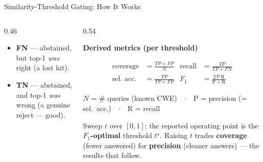 \documentclass[aspectratio=169,10pt]{beamer}
\begin{document}
\begin{frame}{Similarity-Threshold Gating: How It Works}
\begin{columns}[T]
\begin{column}{0.46\textwidth}
      \vspace{0.6em}
      {\scriptsize
      \begin{itemize}\itemsep3pt
        \item \textbf{FN} --- abstained, but top-1 \emph{was} right \textcolor{warn!80!black}{(a lost hit)}.
        \item \textbf{TN} --- abstained, and top-1 \emph{was} wrong \textcolor{hit!70!black}{(a genuine reject --- good)}.
      \end{itemize}}
    \end{column}
    \begin{column}{0.54\textwidth}
      \begin{center}
        {\scriptsize\textbf{Derived metrics (per threshold)}}
      \end{center}
      \vspace{0.1em}
      {\footnotesize
      \[
      \begin{aligned}
        \text{coverage}   &= \frac{TP+FP}{N}   &  \text{recall} &= \frac{TP}{TP+FN}\\[4pt]
        \text{sel.\ acc.} &= \frac{TP}{TP+FP}   &  F_1 &= \frac{2\,\mathrm{P}\,\mathrm{R}}{\mathrm{P}+\mathrm{R}}
      \end{aligned}
      \]}
      \begin{center}
        {\tiny\textcolor{notecol}{$N$ = \# queries (known CWE)\ \ $\cdot$\ \ P = precision (= sel.\ acc.)\ \ $\cdot$\ \ R = recall}}
      \end{center}

      \vspace{0.3em}
      \begin{tcolorbox}[colback=c1!4, colframe=c1!60!black, boxrule=0.35pt,
        left=3pt, right=3pt, top=2pt, bottom=2pt, arc=2pt, width=\linewidth]
        \scriptsize
        Sweep $t$ over $[0,1]$; the reported operating point is the \textbf{$F_1$-optimal} threshold $t^\star$. Raising $t$ trades \textbf{coverage} (fewer answered) for \textbf{precision} (cleaner answers) --- the results that follow.
      \end{tcolorbox}
    \end{column}
  \end{columns}

\end{frame}
\end{document}

